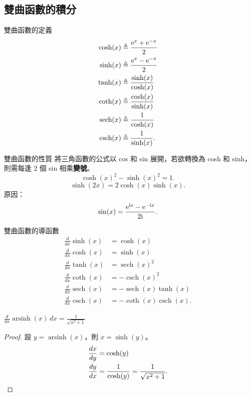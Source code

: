 \documentclass{beamer}
\newcommand  {\e}{\text e}
\renewcommand{\i}{\text i}
\newcommand{\sech}  {\operatorname{sech}}
\newcommand{\csch}  {\operatorname{csch}}
\newcommand{\arsinh}{\operatorname{arsinh}}
\theoremstyle{remark}
\begin{document}
\begin{CJK}{UTF8}{bsmi}
\subsection{雙曲函數的積分}
\begin{frame}{雙曲函數的定義}
  \begin{align*}
    \cosh(x) &\triangleq \frac{\e^x + \e^{-x}}{2}\\
    \sinh(x) &\triangleq \frac{\e^x - \e^{-x}}{2}\\
    \tanh(x) &\triangleq \frac{\sinh(x)}{\cosh(x)}\\
    \coth(x) &\triangleq \frac{\cosh(x)}{\sinh(x)}\\
    \sech(x) &\triangleq \frac{1}{\cosh(x)}\\
    \csch(x) &\triangleq \frac{1}{\sinh(x)}.
  \end{align*}
\end{frame}

\begin{frame}{雙曲函數的性質}
  將三角函數的公式以 cos 和 sin 展開，若欲轉換為 cosh 和 sinh，則需每逢 2 個 sin 相乘\textbf{變號}。
  \[\cosh(x)^2 - \sinh(x)^2 = 1.\]
  \[\sinh(2x) = 2 \cosh(x) \sinh(x).\]
  原因：
  \[\sin(x) = \frac{\e^{\i x} - \e^{-\i x}}{2\i}.\]
\end{frame}

\begin{frame}{雙曲函數的導函數}
  \begin{align*}
    \frac{d}{dx} \sinh(x) &= \cosh(x)\\
    \frac{d}{dx} \cosh(x) &= \sinh(x)\\
    \frac{d}{dx} \tanh(x) &= \sech(x)^2\\
    \frac{d}{dx} \coth(x) &= -\csch(x)^2\\
    \frac{d}{dx} \sech(x) &= -\sech(x) \tanh(x)\\
    \frac{d}{dx} \csch(x) &= -\coth(x) \csch(x).
  \end{align*}
\end{frame}

\begin{frame}{$\displaystyle \frac{d}{dx} \arsinh(x)\,dx = \frac{1}{\sqrt{x^2 + 1}}$}
  \begin{proof}
    設 $y = \arsinh(x)$，則 $x = \sinh(y)$。
    \begin{align*}
      \frac{dx}{dy} &= \cosh(y)\\
      \frac{dy}{dx} &= \frac{1}{\cosh(y)} = \frac{1}{\sqrt{x^2 + 1}}. \qedhere
    \end{align*}
  \end{proof}
\end{frame}


\end{CJK}
\end{document}
